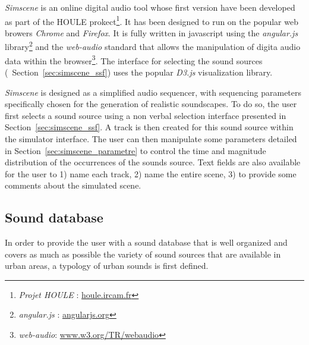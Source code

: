 \documentclass[twoside,twocolumn]{article}
\begin{document}
\emph{Simscene} is an online digital audio tool whose first version have been developed as part of the HOULE prokect\footnote{\emph{Projet HOULE} : \url{houle.ircam.fr}}. It has been designed to run on the popular web browers \emph{Chrome} and \emph{Firefox}. It is fully written in javascript using the \emph{angular.js} library\footnote{\emph{angular.js} : \url{angularjs.org}} and the \emph{web-audio} standard that allows the manipulation of digita audio data within the browser\footnote{\emph{web-audio}: \url{www.w3.org/TR/webaudio}}. The interface for selecting the sound sources (\cf~Section~\ref{sec:simscene_ssf}) uses the popular \emph{D3.js} \cite{d32011} visualization library.


\emph{Simscene} is designed as a simplified audio sequencer, with sequencing parameters specifically chosen for the generation of realistic soundscapes. To do so, the user first selects a sound source using a non verbal selection interface presented in Section~\ref{sec:simscene_ssf}. A track is then created for this sound source within the simulator interface. The user can then manipulate some parameters detailed in Section~\ref{sec:simscene_parametre} to control the time and magnitude distribution of the occurrences of the sounds source. Text fields are also available for the user to 1) name each track, 2) name the entire scene, 3) to provide some comments about the simulated scene.

\subsection{Sound database}
\label{sec:simscene_sampleDataSet}

In order to provide the user with a sound database that is well organized and covers as much as possible the variety of sound sources that are available in urban areas, a typology of urban sounds is first defined.
\end{document}
